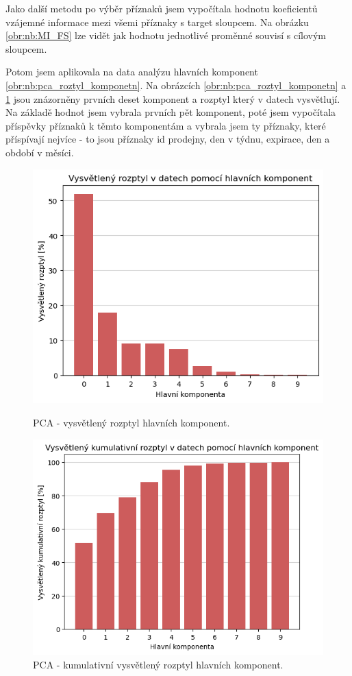 Jako další metodu po výběr příznaků jsem vypočítala hodnotu koeficientů vzájemné informace mezi všemi příznaky s target sloupcem. Na obrázku \ref*{obr:nb:MI_FS} lze vidět jak hodnotu jednotlivé proměnné souvisí s cílovým sloupcem.

Potom jsem aplikovala na data analýzu hlavních komponent \ref*{obr:nb:pca_roztyl_komponetn}. Na obrázcích \ref*{obr:nb:pca_roztyl_komponetn} a \ref*{obr:nb:pca_kum_roztyl_komponetn} jsou znázorněny prvních deset komponent a rozptyl který v datech vysvětlují. Na základě hodnot jsem vybrala prvních pět komponent, poté jsem vypočítala příspěvky příznaků k těmto komponentám a vybrala jsem ty příznaky, které příspívají nejvíce - to jsou příznaky id prodejny, den v týdnu, expirace, den a období v měsíci.

\begin{figure}
    \centering
    \begin{minipage}{.5\textwidth}
      \centering
      \includegraphics[width=.8\textwidth]{obrazky/zntb/pca-roztyl_komponetn.png}
      \caption{PCA - vysvětlený rozptyl hlavních komponent.}
      \label{obr:nb:pca_roztyl_komponetn}
    \end{minipage}%
    \begin{minipage}{.5\textwidth}
      \centering
      \includegraphics[width=.8\textwidth]{obrazky/zntb/pca-kum_roztyl_komponetn.png}
      \caption{PCA - kumulativní vysvětlený rozptyl hlavních komponent.}
      \label{obr:nb:pca_kum_roztyl_komponetn}
    \end{minipage}
    \end{figure}

